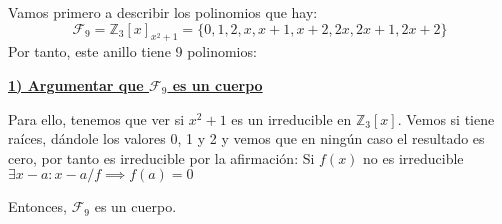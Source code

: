 \documentclass[11pt, a4paper, titlepage]{article}
\providecommand{\ent}{\mathbb{Z}}
\theoremstyle{theorem-style}
\theoremstyle{definition-style}
\theoremstyle{remark-style}
\theoremstyle{example-style}
\begin{document}

Vamos primero a describir los polinomios que hay:
\[
\mathcal{F}_9 =\ent_3[x]_{x^2+1}= \{0,1,2,x,x+1,x+2,2x,2x+1,2x+2\}
\]
Por tanto, este anillo tiene 9 polinomios:

\underline{\textbf{1) Argumentar que $\mathcal{F}_9$ es un cuerpo}}

Para ello, tenemos que ver si $x^2+1$ es un irreducible en $\ent_3[x]$. Vemos si tiene raíces, dándole los valores 0, 1 y 2 y vemos que en ningún caso el resultado es cero, por tanto es irreducible por la afirmación: Si $f(x)$ no es irreducible $\exists x-a : x-a/f \implies f(a) = 0$

Entonces, $\mathcal{F}_9$ es un cuerpo.
\end{document}
